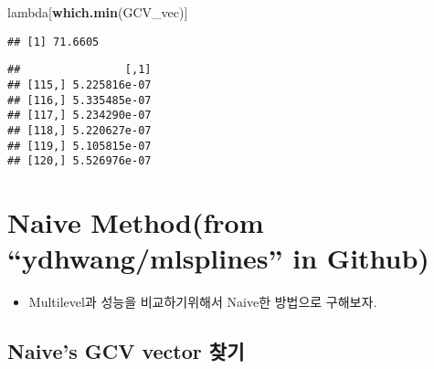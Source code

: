 \documentclass[
]{article}
\newenvironment{Shaded}{\begin{snugshade}}{\end{snugshade}}
\newcommand{\DataTypeTok}[1]{\textcolor[rgb]{0.13,0.29,0.53}{#1}}
\newcommand{\DecValTok}[1]{\textcolor[rgb]{0.00,0.00,0.81}{#1}}
\newcommand{\KeywordTok}[1]{\textcolor[rgb]{0.13,0.29,0.53}{\textbf{#1}}}
\newcommand{\NormalTok}[1]{#1}
\newcommand{\OperatorTok}[1]{\textcolor[rgb]{0.81,0.36,0.00}{\textbf{#1}}}
\newcommand{\StringTok}[1]{\textcolor[rgb]{0.31,0.60,0.02}{#1}}
\providecommand{\tightlist}{%
  \setlength{\itemsep}{0pt}\setlength{\parskip}{0pt}}
\begin{document}
\begin{Shaded}
\begin{Highlighting}[]
\NormalTok{lambda[}\KeywordTok{which.min}\NormalTok{(GCV\_vec)]}
\end{Highlighting}
\end{Shaded}

\begin{verbatim}
## [1] 71.6605
\end{verbatim}

\begin{Shaded}
\end{Shaded}

\begin{verbatim}
##                [,1]
## [115,] 5.225816e-07
## [116,] 5.335485e-07
## [117,] 5.234290e-07
## [118,] 5.220627e-07
## [119,] 5.105815e-07
## [120,] 5.526976e-07
\end{verbatim}

\newpage

\hypertarget{naive-methodfrom-ydhwangmlsplines-in-github}{%
\section{Naive Method(from ``ydhwang/mlsplines'' in Github)}\label{naive-methodfrom-ydhwangmlsplines-in-github}}

\begin{itemize}
\tightlist
\item
  Multilevel과 성능을 비교하기위해서 Naive한 방법으로 구해보자.
\end{itemize}

\hypertarget{naives-gcv-vector-uxcc3euxae30}{%
\subsection{Naive's GCV vector 찾기}\label{naives-gcv-vector-uxcc3euxae30}}
\end{document}
